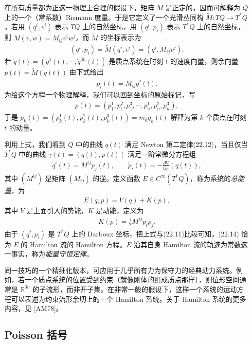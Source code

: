 \documentclass[../../main.tex]{subfiles}
\begin{document}
\begin{example}[$n$ 体问题]
在所有质量都为正这一物理上合理的假设下，矩阵 $M$ 是正定的，因而可解释为 $Q$ 上的一个（常系数）Riemann 度量。于是它定义了一个光滑丛同构 $\widetilde M:TQ\to T^*Q$。若用 $(q^i,v^i)$ 表示 $TQ$ 上的自然坐标，用 $(q^i,p_i)$ 表示 $T^*Q$ 上的自然坐标，则 $M(v,w)=M_{ij}v^iw^j$，而 $\widetilde M$ 的坐标表示为
\begin{align*}
(q^i,p_i)=\widetilde M(q^i,v^i)=(q^i,M_{ij}v^j).
\end{align*}
若 $\dot q(t)=(\dot q^1(t),\cdots ,\dot q^{3n}(t))$ 是质点系统在时刻 $t$ 的速度向量，则余向量 $p(t)=\widetilde M(\dot q(t))$ 由下式给出
\begin{align}
p_i(t)=M_{ij}\dot q^j(t).
\end{align}
为给这个方程一个物理解释，我们可以回到坐标的原始标记，写
\begin{align*}
p(t)=(p_1^1,p_1^2,p_1^3,\cdots ,p_n^1,p_n^2,p_n^3),
\end{align*}
于是 $p_k(t)=(p_k^1(t),p_k^2(t),p_k^3(t))=m_k\dot q_k(t)$ 解释为第 $k$ 个质点在时刻 $t$ 的动量。

利用上式，我们看到 $Q$ 中的曲线 $q(t)$ 满足 Newton 第二定律(22.12)，当且仅当 $T^*Q$ 中的曲线 $\gamma(t)=(q(t),p(t))$ 满足一阶常微分方程组
\begin{align}
\dot q^i(t)=M^{ij}p_j(t),\qquad
\dot p_i(t)=-\frac{\partial V}{\partial q^i}(q(t)),
\end{align}
其中 $(M^{ij})$ 是矩阵 $(M_{ij})$ 的逆。定义函数 $E\in C^\infty(T^*Q)$，称为系统的\emph{总能量}，为
\begin{align*}
E(q,p)=V(q)+K(p),
\end{align*}
其中 $V$ 是上面引入的势能，$K$ 是动能，定义为
\begin{align*}
K(p)=\tfrac12 M^{ij}p_ip_j.
\end{align*}
由于 $(q^i,p_i)$ 是 $T^*Q$ 上的 Darboux 坐标，把上式与(22.11)比较可知，(22.14) 恰为 $E$ 的 Hamilton 流的 Hamilton 方程。$E$ 沿其自身 Hamilton 流的轨迹为常数这一事实，称为\emph{能量守恒定律}。
\end{example}

同一技巧的一个精细化版本，可应用于几乎所有力为保守力的经典动力系统。例如，若一个质点系统的位置受到约束（就像刚体的组成质点那样），则位形空间通常是 $\mathbb{R}^{3n}$ 的子流形，而非开子集。在非常一般的假设下，这样一个系统的运动方程可以表述为约束流形余切上的一个 Hamilton 系统。关于 Hamilton 系统的更多内容，见 [AM78]。

\subsection*{Poisson 括号}
\end{document}

